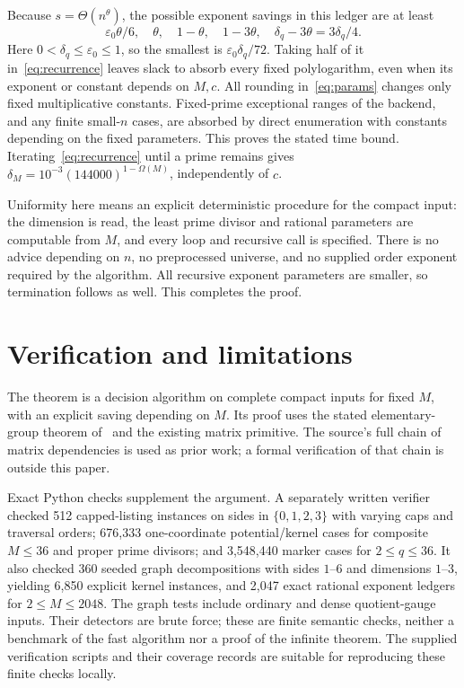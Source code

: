 \documentclass[manuscript,screen,nonacm,11pt]{acmart}
\newcommand{\eps}{\varepsilon_0}
\newcommand{\Om}{\Omega}
\begin{document}
Because $s=\Theta(n^\theta)$, the possible exponent savings in this ledger
are at least
\[
 \eps\theta/6,\quad\theta,\quad1-\theta,\quad
 1-3\theta,\quad\delta_q-3\theta=3\delta_q/4.
\]
Here $0<\delta_q\le\eps\le1$, so the smallest is
$\eps\delta_q/72$. Taking half of it in~\eqref{eq:recurrence} leaves
slack to absorb every fixed polylogarithm, even when its exponent or constant
depends on $M,c$. All rounding in~\eqref{eq:params} changes only fixed
multiplicative constants. Fixed-prime exceptional ranges of the backend,
and any finite small-$n$ cases, are absorbed by direct enumeration with
constants depending on the fixed parameters. This proves the stated time
bound. Iterating~\eqref{eq:recurrence} until a prime remains gives
$\delta_M=10^{-3}(144000)^{1-\Om(M)}$, independently of $c$.

Uniformity here means an explicit deterministic procedure for the compact
input: the dimension is read, the least prime divisor and rational parameters
are computable from $M$, and every loop and recursive call is specified.
There is no advice depending on $n$, no preprocessed universe, and no supplied
order exponent required by the algorithm. All recursive exponent parameters
are smaller, so termination follows as well. This completes the proof.

\section{Verification and limitations}

The theorem is a decision algorithm on complete compact inputs for fixed
$M$, with an explicit saving depending on $M$. Its proof uses the stated
elementary-group theorem of~\cite{Maj26} and the existing matrix primitive.
The source's full chain of matrix dependencies is used as prior work; a
formal verification of that chain is outside this paper.

Exact Python checks supplement the argument. A separately written verifier
checked 512 capped-listing instances on sides in $\{0,1,2,3\}$ with varying
caps and traversal orders; 676,333 one-coordinate potential/kernel cases
for composite $M\le36$ and proper prime divisors; and 3,548,440 marker cases
for $2\le q\le36$. It also checked 360 seeded graph decompositions with
sides $1$--$6$ and dimensions $1$--$3$, yielding 6,850 explicit kernel
instances, and 2,047 exact rational exponent ledgers for $2\le M\le2048$.
The graph tests include ordinary and dense quotient-gauge inputs. Their
detectors are brute force; these are finite semantic checks, neither a
benchmark of the fast algorithm nor a proof of the infinite theorem.
The supplied verification scripts and their coverage records are suitable
for reproducing these finite checks locally.
\end{document}
